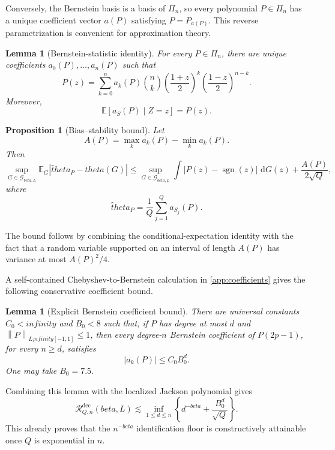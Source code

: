 \documentclass[11pt]{article}
\def\beta{beta}%
\def\theta{theta}%
\def\infty{infinity}%
\newtheorem{proposition}[theorem]{Proposition}
\newtheorem{lemma}[theorem]{Lemma}
\newcommand{\E}{\mathbb E}
\newcommand{\sgn}{\operatorname{sgn}}
\newcommand{\calG}{\mathcal G}
\newcommand{\calR}{\mathcal R}
\newcommand{\norm}[1]{\left\lVert#1\right\rVert}
\newcommand{\dd}{\,\mathrm d}
\begin{document}
Conversely, the Bernstein basis is a basis of $\Pi_n$, so every polynomial $P\in\Pi_n$ has a unique coefficient vector $a(P)$ satisfying $P=P_{a(P)}$.  This reverse parametrization is convenient for approximation theory.

\begin{lemma}[Bernstein-statistic identity]
\label{lem:bernstein-identity}
For every $P\in\Pi_n$, there are unique coefficients $a_0(P),\dots,a_n(P)$ such that
\begin{equation}
\label{eq:bernstein-representation}
P(z)
=
\sum_{k=0}^n a_k(P)
\binom nk
\left(\frac{1+z}{2}\right)^k
\left(\frac{1-z}{2}\right)^{n-k}.
\end{equation}
Moreover,
\[
\E[a_S(P)\mid Z=z]=P(z).
\]
\end{lemma}

\begin{proposition}[Bias--stability bound]
\label{prop:bias-stability}
Let
\[
A(P)=\max_k a_k(P)-\min_k a_k(P).
\]
Then
\begin{equation}
\label{eq:bias-stability}
\sup_{G\in\calG_{\beta,L}}
\E_G|\widehat\theta_P-\theta(G)|
\le
\sup_{G\in\calG_{\beta,L}}
\int|P(z)-\sgn(z)|\,\dd G(z)
+
\frac{A(P)}{2\sqrt Q},
\end{equation}
where
\[
\widehat\theta_P=\frac1Q\sum_{j=1}^Q a_{S_j}(P).
\]
\end{proposition}
The bound follows by combining the conditional-expectation identity with the fact that a random variable supported on an interval of length $A(P)$ has variance at most $A(P)^2/4$.

A self-contained Chebyshev-to-Bernstein calculation in \cref{app:coefficients} gives the following conservative coefficient bound.

\begin{lemma}[Explicit Bernstein coefficient bound]
\label{lem:B0}
There are universal constants $C_0<\infty$ and $B_0<8$ such that, if $P$ has degree at most $d$ and $\norm{P}_{L_\infty[-1,1]}\le1$, then every degree-$n$ Bernstein coefficient of $P(2p-1)$, for every $n\ge d$, satisfies
\[
|a_k(P)|\le C_0B_0^d.
\]
One may take $B_0=7.5$.
\end{lemma}

Combining this lemma with the localized Jackson polynomial gives
\begin{equation}
\label{eq:B0-upper}
\calR^{\mathrm{dec}}_{Q,n}(\beta,L)
\lesssim
\inf_{1\le d\le n}
\left\{
 d^{-\beta}+\frac{B_0^d}{\sqrt Q}
\right\}.
\end{equation}
This already proves that the $n^{-\beta}$ identification floor is constructively attainable once $Q$ is exponential in $n$.
\end{document}
